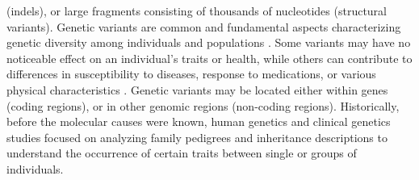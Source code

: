 \documentclass[a4paper, titlepage, openright]{book}
\begin{document}
(indels), or large fragments consisting of thousands of nucleotides (structural variants). Genetic variants are common and fundamental aspects characterizing genetic diversity among individuals and populations \citep{siva20081000}. Some variants may have no noticeable effect on an individual's traits or health, while others can contribute to differences in susceptibility to diseases, response to medications, or various physical characteristics \citep{bodmer2008common, ingelman2018integrating, mitchell2007evolutionary}. Genetic variants may be located either within genes (coding regions), or in other genomic regions (non-coding regions). Historically, before the molecular causes were known, human genetics and clinical genetics studies focused on analyzing family pedigrees and inheritance descriptions to understand the occurrence of certain traits between single or groups of individuals.
\end{document}
